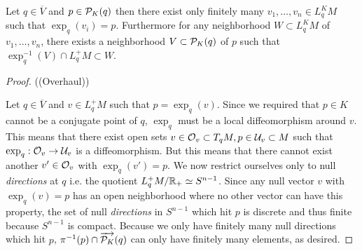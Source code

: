 \begin{lemma}\label{lem:finitevecs}
    Let $q\in \overline{V}$ and $p\in \mathcal{P}_K(q)$ then there exist only finitely many $v_1,\dots,v_n\in L^K_qM$ such that $\exp_q(v_i)=p$. Furthermore for any neighborhood $W\subset L^K_qM$ of $v_1,\dots,v_n$, there exists a neighborhood $V\subset \mathcal{P}_K(q)$ of $p$ such that $\exp^{-1}_q(V) \cap L^+_qM \subset W$. 
\end{lemma}
\begin{proof}
    ((Overhaul))

    Let $q\in \overline{V}$ and $v\in L^+_qM$ such that $p=\exp_q(v)$. Since we required that $p\in K$ cannot be a conjugate point of $q$, $\exp_q$ must be a local diffeomorphism around $v$. This means that there exist open sets $v\in\mathcal{O}_v\subset T_qM, p\in \mathcal{U}_v\subset M$ such that $\exp_q:\mathcal{O}_v\to \mathcal{U}_v$ is a diffeomorphism. But this means that there cannot exist another $v'\in \mathcal{O}_v$ with $\exp_q(v')=p$. We now restrict ourselves only to null \emph{directions} at $q$ i.e. the quotient $L^+_qM/\mathbb{R}_+ \simeq S^{n-1}$. Since any null vector $v$ with $\exp_q(v)=p$ has an open neighborhood where no other vector can have this property, the set of null \emph{directions} in $S^{n-1}$ which hit $p$ is discrete and thus finite because $S^{n-1}$ is compact. Because we only have finitely many null directions which hit $p$, $\pi^{-1}(p)\cap \overrightarrow{\mathcal{P}_K}(q)$ can only have finitely many elements, as desired.
\end{proof}


